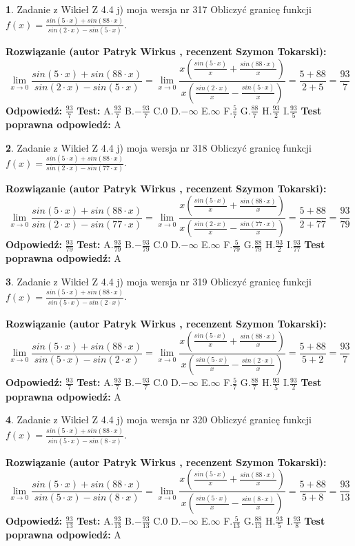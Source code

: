 \documentclass[12pt, a4paper]{article}
\theoremstyle{definition} %
\newtheorem{zad}{}
\newcommand{\zadStart}[1]{\begin{zad}#1\newline}
\newcommand{\zadStop}{\end{zad}}
\newcommand{\rozwStart}[2]{\noindent \textbf{Rozwiązanie (autor #1 , recenzent #2): }\newline}
\newcommand{\rozwStop}{\newline}
\newcommand{\odpStart}{\noindent \textbf{Odpowiedź:}\newline}
\newcommand{\odpStop}{\newline}
\newcommand{\testStart}{\noindent \textbf{Test:}\newline}
\newcommand{\testStop}{\newline}
\newcommand{\kluczStart}{\noindent \textbf{Test poprawna odpowiedź:}\newline}
\newcommand{\kluczStop}{\newline}
\begin{document}
\zadStart{Zadanie z Wikieł Z 4.4 j) moja wersja nr 317}
Obliczyć granicę funkcji $f(x)=\frac{sin(5\cdot x) +sin(88\cdot x)}{sin(2\cdot x) -sin(5\cdot x)}$.
\zadStop
\rozwStart{Patryk Wirkus}{Szymon Tokarski}
$$\lim\limits_{x\to 0}\frac{sin(5\cdot x) +sin(88\cdot x)}{sin(2\cdot x) -sin(5\cdot x)}=\lim\limits_{x\to 0}\frac{x(\frac{sin(5\cdot x)}{x}+\frac{sin(88\cdot x)}{x})}{x(\frac{sin(2\cdot x)}{x}-\frac{sin(5\cdot x)}{x})}=\frac{5+88}{2+5} = \frac{93}{7}$$
\rozwStop
\odpStart
$\frac{93}{7}$
\odpStop
\testStart
A.$\frac{93}{7}$
B.$-\frac{93}{7}$
C.$0$
D.$-\infty$
E.$\infty$
F.$\frac{5}{7}$
G.$\frac{88}{7}$
H.$\frac{93}{2}$
I.$\frac{93}{5}$
\testStop
\kluczStart
A
\kluczStop



\zadStart{Zadanie z Wikieł Z 4.4 j) moja wersja nr 318}
Obliczyć granicę funkcji $f(x)=\frac{sin(5\cdot x) +sin(88\cdot x)}{sin(2\cdot x) -sin(77\cdot x)}$.
\zadStop
\rozwStart{Patryk Wirkus}{Szymon Tokarski}
$$\lim\limits_{x\to 0}\frac{sin(5\cdot x) +sin(88\cdot x)}{sin(2\cdot x) -sin(77\cdot x)}=\lim\limits_{x\to 0}\frac{x(\frac{sin(5\cdot x)}{x}+\frac{sin(88\cdot x)}{x})}{x(\frac{sin(2\cdot x)}{x}-\frac{sin(77\cdot x)}{x})}=\frac{5+88}{2+77} = \frac{93}{79}$$
\rozwStop
\odpStart
$\frac{93}{79}$
\odpStop
\testStart
A.$\frac{93}{79}$
B.$-\frac{93}{79}$
C.$0$
D.$-\infty$
E.$\infty$
F.$\frac{5}{79}$
G.$\frac{88}{79}$
H.$\frac{93}{2}$
I.$\frac{93}{77}$
\testStop
\kluczStart
A
\kluczStop



\zadStart{Zadanie z Wikieł Z 4.4 j) moja wersja nr 319}
Obliczyć granicę funkcji $f(x)=\frac{sin(5\cdot x) +sin(88\cdot x)}{sin(5\cdot x) -sin(2\cdot x)}$.
\zadStop
\rozwStart{Patryk Wirkus}{Szymon Tokarski}
$$\lim\limits_{x\to 0}\frac{sin(5\cdot x) +sin(88\cdot x)}{sin(5\cdot x) -sin(2\cdot x)}=\lim\limits_{x\to 0}\frac{x(\frac{sin(5\cdot x)}{x}+\frac{sin(88\cdot x)}{x})}{x(\frac{sin(5\cdot x)}{x}-\frac{sin(2\cdot x)}{x})}=\frac{5+88}{5+2} = \frac{93}{7}$$
\rozwStop
\odpStart
$\frac{93}{7}$
\odpStop
\testStart
A.$\frac{93}{7}$
B.$-\frac{93}{7}$
C.$0$
D.$-\infty$
E.$\infty$
F.$\frac{5}{7}$
G.$\frac{88}{7}$
H.$\frac{93}{5}$
I.$\frac{93}{2}$
\testStop
\kluczStart
A
\kluczStop



\zadStart{Zadanie z Wikieł Z 4.4 j) moja wersja nr 320}
Obliczyć granicę funkcji $f(x)=\frac{sin(5\cdot x) +sin(88\cdot x)}{sin(5\cdot x) -sin(8\cdot x)}$.
\zadStop
\rozwStart{Patryk Wirkus}{Szymon Tokarski}
$$\lim\limits_{x\to 0}\frac{sin(5\cdot x) +sin(88\cdot x)}{sin(5\cdot x) -sin(8\cdot x)}=\lim\limits_{x\to 0}\frac{x(\frac{sin(5\cdot x)}{x}+\frac{sin(88\cdot x)}{x})}{x(\frac{sin(5\cdot x)}{x}-\frac{sin(8\cdot x)}{x})}=\frac{5+88}{5+8} = \frac{93}{13}$$
\rozwStop
\odpStart
$\frac{93}{13}$
\odpStop
\testStart
A.$\frac{93}{13}$
B.$-\frac{93}{13}$
C.$0$
D.$-\infty$
E.$\infty$
F.$\frac{5}{13}$
G.$\frac{88}{13}$
H.$\frac{93}{5}$
I.$\frac{93}{8}$
\testStop
\kluczStart
A
\kluczStop
\end{document}
